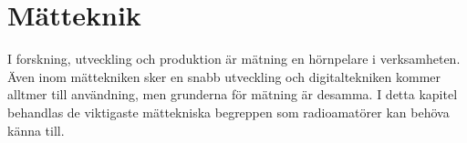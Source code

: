 \chapter{Mätteknik}

I forskning, utveckling och produktion är mätning en hörnpelare i verksamheten.
Även inom mättekniken sker en snabb utveckling och digitaltekniken kommer
alltmer till användning, men grunderna för mätning är desamma.
I detta kapitel behandlas de viktigaste mättekniska begreppen som radioamatörer
kan behöva känna till.
